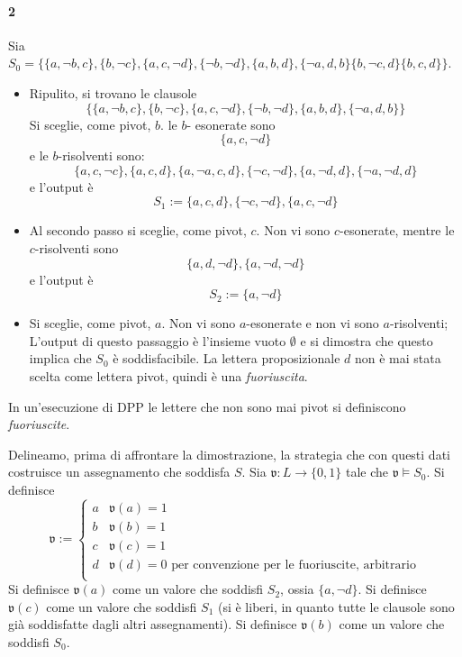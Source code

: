 \paragraph{2}
Sia $S_0 = \{\{a, \neg b, c\}, \{b, \neg c\}, \{a,c,\neg d\}, \{\neg b, \neg d\}, \{a,b,d\}, \{\neg a, d,b\} \{b, \neg c, d\}\{b, c, d\}\}$. 
\begin{itemize}
        \item Ripulito, si trovano le clausole 
$$ 
\{\{a, \neg b, c\}, \{b, \neg c\}, \{a,c,\neg d\}, \{\neg b, \neg d\}, \{a,b,d\}, \{\neg a, d,b\}\}
$$
Si sceglie, come pivot, $b$. 
le $b$- esonerate sono
$$
\{a, c, \neg d\}
$$
e le $b$-risolventi sono: 
$$
\{a, c, \neg c\}, \{a,c,d\}, \{a, \neg a, c, d\}, \{\neg c, \neg d\}, \{a, \neg d, d\}, \{\neg a, \neg d, d\}
$$
e l'output è 
$$
S_1 := \{a, c,d\}, \{\neg c, \neg d\}, \{a, c, \neg d\}
$$
\item Al secondo passo si sceglie, come pivot, $c$. 
Non vi sono $c$-esonerate, mentre 
le $c$-risolventi sono 
$$
\{a, d, \neg d\}, \{a, \neg d, \neg d\}
$$
e l'output è 
$$
S_2 := \{a, \neg d\}
$$
\item Si sceglie, come pivot, $a$. 
Non vi sono $a$-esonerate e non vi sono $a$-risolventi; 
L'output di questo passaggio è l'insieme vuoto $\emptyset$ e si dimostra 
che questo implica che $S_0$ è soddisfacibile.
La lettera proposizionale $d$ non è mai stata scelta come lettera pivot, quindi è 
una \textit{fuoriuscita}. 
\end{itemize}

\begin{defi}
        In un'esecuzione di DPP le lettere che non sono mai pivot si 
        definiscono \textit{fuoriuscite}.
\end{defi}

Delineamo, prima di affrontare la dimostrazione, la strategia che con questi 
dati costruisce un assegnamento che soddisfa $S$.
Sia $\mathfrak{v}: L \rightarrow \{0,1\}$ tale che $\mathfrak{v} \models S_0$. 
Si definisce
$$
\mathfrak{v} := 
\begin{cases}
        a & \mathfrak{v}(a) = 1\\
        b & \mathfrak{v}(b) = 1\\
        c & \mathfrak{v}(c) = 1\\
        d & \mathfrak{v}(d) = 0 \text{ per convenzione per le fuoriuscite, arbitrario}\\
\end{cases}
$$
Si definisce $\mathfrak{v}(a)$ come un valore che soddisfi $S_2$, ossia $\{a, \neg d\}$.
Si definisce $\mathfrak{v}(c)$ come un valore che soddisfi $S_1$ (si è liberi, in 
quanto tutte le clausole sono già soddisfatte dagli altri assegnamenti). 
Si definisce $\mathfrak{v}(b)$ come un valore che soddisfi $S_0$.

